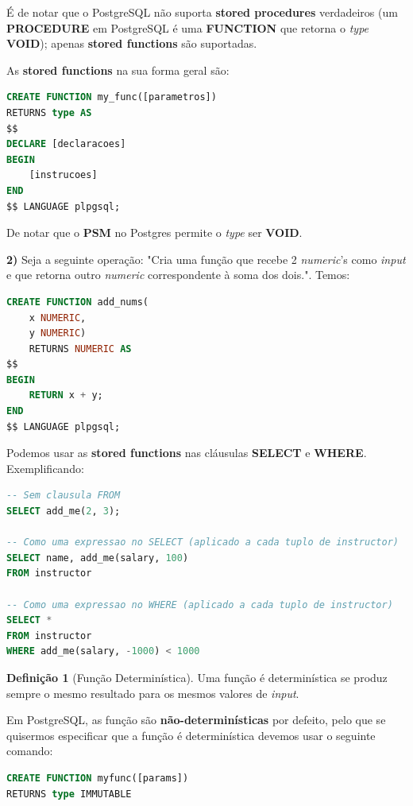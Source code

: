 \documentclass[oneside]{book}
\theoremstyle{definition}
\newtheorem{definition}{Definição}
\begin{document}
É de notar que o PostgreSQL não suporta \textbf{stored procedures} verdadeiros (um \textbf{PROCEDURE} em PostgreSQL é uma \textbf{FUNCTION} que retorna o \textit{type} \textbf{VOID}); apenas \textbf{stored functions} são suportadas.

As \textbf{stored functions} na sua forma geral são:
\begin{lstlisting}[language=SQL, morekeywords={FUNCTION, RETURNS, $$, LANGUAGE, DECLARE}, framesep=8pt, xleftmargin=40pt, framexleftmargin=40pt, frame=tb, framerule=0pt]
CREATE FUNCTION my_func([parametros]) 
RETURNS type AS
$$
DECLARE [declaracoes]
BEGIN
    [instrucoes]
END
$$ LANGUAGE plpgsql;
\end{lstlisting}
De notar que o \textbf{PSM} no Postgres permite o \textit{type} ser \textbf{VOID}.

\textbf{2)} Seja a seguinte operação: "Cria uma função que recebe 2 \textit{numeric}'s como \textit{input} e que retorna outro \textit{numeric} correspondente à soma dos dois.". Temos:
\begin{lstlisting}[language=SQL, morekeywords={FUNCTION, RETURNS, $$, LANGUAGE, DECLARE}, framesep=8pt, xleftmargin=40pt, framexleftmargin=40pt, frame=tb, framerule=0pt]
CREATE FUNCTION add_nums(
    x NUMERIC,
    y NUMERIC) 
    RETURNS NUMERIC AS
$$
BEGIN
    RETURN x + y;
END
$$ LANGUAGE plpgsql;
\end{lstlisting}

Podemos usar as \textbf{stored functions} nas cláusulas \textbf{SELECT} e \textbf{WHERE}. Exemplificando:
\begin{lstlisting}[language=SQL, morekeywords={FUNCTION, RETURNS, $$, LANGUAGE, DECLARE}, framesep=8pt, xleftmargin=40pt, framexleftmargin=40pt, frame=tb, framerule=0pt]
-- Sem clausula FROM
SELECT add_me(2, 3);

-- Como uma expressao no SELECT (aplicado a cada tuplo de instructor)
SELECT name, add_me(salary, 100)
FROM instructor

-- Como uma expressao no WHERE (aplicado a cada tuplo de instructor)
SELECT *
FROM instructor
WHERE add_me(salary, -1000) < 1000
\end{lstlisting}

\begin{definition}[Função Determinística]
Uma função é determinística se produz sempre o mesmo resultado para os mesmos valores de \textit{input}.
\end{definition}
Em PostgreSQL, as função são \textbf{não-determinísticas} por defeito, pelo que se quisermos especificar que a função é determinística devemos usar o seguinte comando:
\begin{lstlisting}[language=SQL, morekeywords={FUNCTION, RETURNS, $$, LANGUAGE, DECLARE, IMMUTABLE}, framesep=8pt, xleftmargin=40pt, framexleftmargin=40pt, frame=tb, framerule=0pt]
CREATE FUNCTION myfunc([params]) 
RETURNS type IMMUTABLE
\end{lstlisting}
\end{document}
